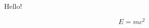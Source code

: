 \documentclass{revtex4-2}
\begin{document}
Hello!

\begin{equation}
    E = m c^{2}
\end{equation}
\end{document}
